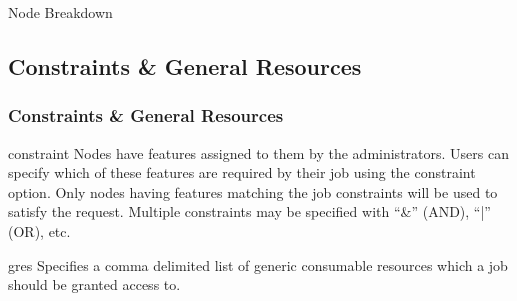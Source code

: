 \begin{frame}
\begin{block}{\small Node Breakdown}
\centering
\end{block}
\end{frame}

\subsection{Constraints \& General Resources}

\begin{frame}
\frametitle{Constraints \&  General Resources}
\begin{block}{{\ddash}constraint} Nodes have features assigned to them by the administrators. Users can specify which of these features are required by their job using the constraint option. Only nodes having features matching the job constraints will be used to satisfy the request.  Multiple constraints may be specified with ``\&'' (AND), ``|'' (OR), etc.
\end{block}
\begin{block}{{\ddash}gres} Specifies a comma delimited list of generic consumable resources which a job should be granted access to. 
\end{block}
\end{frame}

